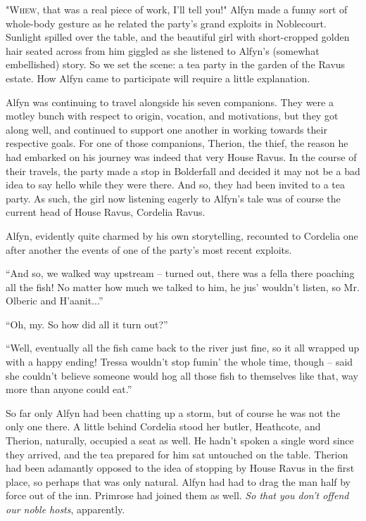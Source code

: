 "\textsc{Whew,} that was a real piece of work, I'll tell you!" Alfyn made a funny sort of whole-body gesture as he related the party's grand exploits in Noblecourt. Sunlight spilled over the table, and the beautiful girl with short-cropped golden hair seated across from him giggled as she listened to Alfyn's (somewhat embellished) story. So we set the scene: a tea party in the garden of the Ravus estate. How Alfyn came to participate will require a little explanation.

Alfyn was continuing to travel alongside his seven companions. They were a motley bunch with respect to origin, vocation, and motivations, but they got along well, and continued to support one another in working towards their respective goals. For one of those companions, Therion, the thief, the reason he had embarked on his journey was indeed that very House Ravus. In the course of their travels, the party made a stop in Bolderfall and decided it may not be a bad idea to say hello while they were there. And so, they had been invited to a tea party. As such, the girl now listening eagerly to Alfyn's tale was of course the current head of House Ravus, Cordelia Ravus. 

Alfyn, evidently quite charmed by his own storytelling, recounted to Cordelia one after another the events of one of the party's most recent exploits.

``And so, we walked way upstream -- turned out, there was a fella there poaching all the fish! No matter how much we talked to him, he jus' wouldn't listen, so Mr. Olberic and H'aanit...''

``Oh, my. So how did all it turn out?''

``Well, eventually all the fish came back to the river just fine, so it all wrapped up with a happy ending! Tressa wouldn't stop fumin' the whole time, though -- said she couldn't believe someone would hog all those fish to themselves like that, way more than anyone could eat.''

So far only Alfyn had been chatting up a storm, but of course he was not the only one there. A little behind Cordelia stood her butler, Heathcote, and Therion, naturally, occupied a seat as well. He hadn't spoken a single word since they arrived, and the tea prepared for him sat untouched on the table. Therion had been adamantly opposed to the idea of stopping by House Ravus in the first place, so perhaps that was only natural. Alfyn had had to drag the man half by force out of the inn. Primrose had joined them as well. \emph{So that you don't offend our noble hosts}, apparently.

